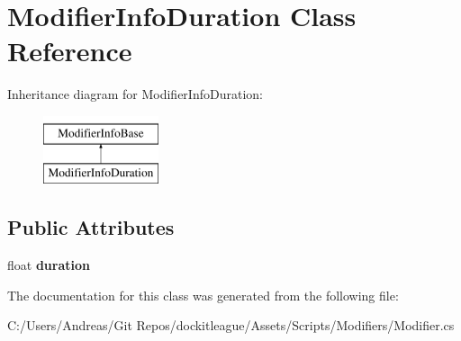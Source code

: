 \hypertarget{class_modifier_info_duration}{}\section{Modifier\+Info\+Duration Class Reference}
\label{class_modifier_info_duration}
Inheritance diagram for Modifier\+Info\+Duration\+:\begin{figure}[H]
\begin{center}
\leavevmode
\includegraphics[height=2.000000cm]{class_modifier_info_duration}
\end{center}
\end{figure}
\subsection*{Public Attributes}
\begin{DoxyCompactItemize}
\item 
\hypertarget{class_modifier_info_duration_a6a6a92b44e989127b3690cda078987fc}{}\label{class_modifier_info_duration_a6a6a92b44e989127b3690cda078987fc} 
float {\bfseries duration}
\end{DoxyCompactItemize}


The documentation for this class was generated from the following file\+:\begin{DoxyCompactItemize}
\item 
C\+:/\+Users/\+Andreas/\+Git Repos/dockitleague/\+Assets/\+Scripts/\+Modifiers/Modifier.\+cs\end{DoxyCompactItemize}
